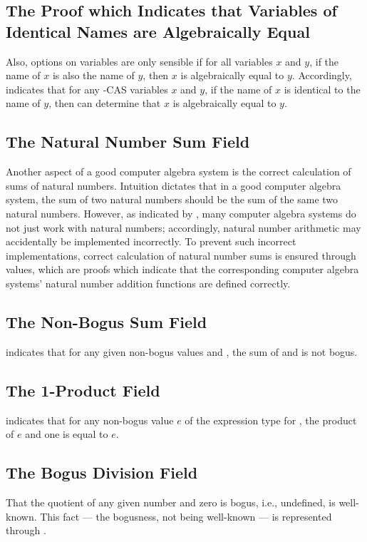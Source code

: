 \documentclass{report}
\begin{document}
\subsection{The Proof which Indicates that Variables of Identical Names are Algebraically Equal}
Also, options on variables are only sensible if for all variables \(x\) and \(y\), if the name of \(x\) is also the name of \(y\), then \(x\) is algebraically equal to \(y\).  Accordingly,   indicates that for any -CAS variables \(x\) and \(y\), if the name of \(x\) is identical to the name of \(y\), then  can determine that \(x\) is algebraically equal to \(y\).

\subsection{The Natural Number Sum Field}
Another aspect of a good computer algebra system is the correct calculation of sums of natural numbers.  Intuition dictates that in a good computer algebra system, the sum of two natural numbers should be the sum of the same two natural numbers.  However, as indicated by , many computer algebra systems do not just work with natural numbers; accordingly, natural number arithmetic may accidentally be implemented incorrectly.  To prevent such incorrect implementations, correct calculation of natural number sums is ensured through  values, which are proofs which indicate that the corresponding computer algebra systems' natural number addition functions are defined correctly.

\subsection{The Non-Bogus Sum Field}
 indicates that for any given non-bogus values  and , the sum of  and  is not bogus.

\subsection{The 1-Product Field}
  indicates that for any non-bogus value \(e\) of the expression type for , the product of \(e\) and one is equal to \(e\).

\subsection{The Bogus Division Field}
That the quotient of any given number and zero is bogus, i.e., undefined, is well-known.  This fact --- the bogusness, not being well-known --- is represented through .
\end{document}
